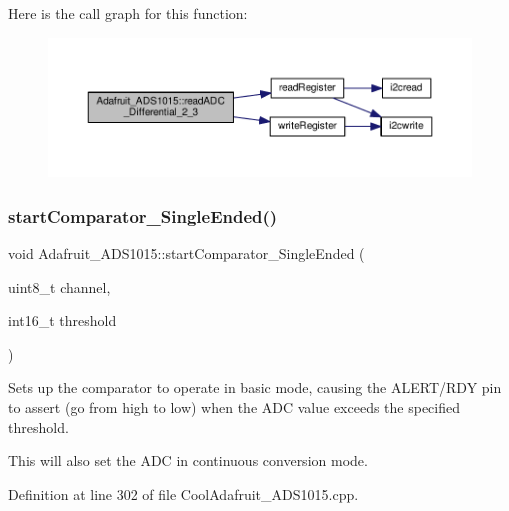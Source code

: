 Here is the call graph for this function\+:
\nopagebreak
\begin{figure}[H]
\begin{center}
\leavevmode
\includegraphics[width=350pt]{df/df6/class_adafruit___a_d_s1015_a38311881bcab46f7496c4bb6e4cad576_cgraph}
\end{center}
\end{figure}
\mbox{\label{class_adafruit___a_d_s1015_aecd30775d943ea9d9cff0e3485926596}} 
\subsubsection{\texorpdfstring{start\+Comparator\+\_\+\+Single\+Ended()}{startComparator\_SingleEnded()}}
{\footnotesize\ttfamily void Adafruit\+\_\+\+A\+D\+S1015\+::start\+Comparator\+\_\+\+Single\+Ended (\begin{DoxyParamCaption}\item[{uint8\+\_\+t}]{channel,  }\item[{int16\+\_\+t}]{threshold }\end{DoxyParamCaption})}



Sets up the comparator to operate in basic mode, causing the A\+L\+E\+R\+T/\+R\+DY pin to assert (go from high to low) when the A\+DC value exceeds the specified threshold. 

This will also set the A\+DC in continuous conversion mode. 

Definition at line 302 of file Cool\+Adafruit\+\_\+\+A\+D\+S1015.\+cpp.



